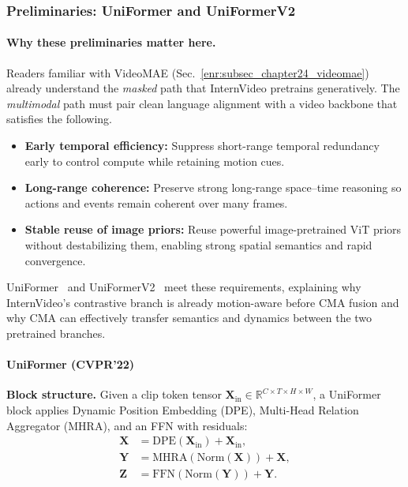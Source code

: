\begin{enrichment}
\begin{enrichment}
        \subsubsection{Preliminaries: UniFormer and UniFormerV2}
        \label{subsubsec_chapter24_uniformer}
        
        \paragraph{Why these preliminaries matter here.}
        Readers familiar with VideoMAE (Sec.~\ref{enr:subsec_chapter24_videomae}) already understand the \emph{masked} path that InternVideo pretrains generatively. The \emph{multimodal} path must pair clean language alignment with a video backbone that satisfies the following.
        
        \begin{itemize}
            \item \textbf{Early temporal efficiency:} Suppress short-range temporal redundancy early to control compute while retaining motion cues. 
            \item \textbf{Long-range coherence:} Preserve strong long-range space--time reasoning so actions and events remain coherent over many frames. 
            \item \textbf{Stable reuse of image priors:} Reuse powerful image-pretrained ViT priors without destabilizing them, enabling strong spatial semantics and rapid convergence. 
        \end{itemize}
        
        UniFormer~\cite{li2022_uniformer} and UniFormerV2~\cite{li2022_uniformerv2} meet these requirements, explaining why InternVideo’s contrastive branch is already motion-aware before CMA fusion and why CMA can effectively transfer semantics and dynamics between the two pretrained branches.
        
        \paragraph{UniFormer (CVPR’22)~\cite{li2022_uniformer}}
        \textbf{Block structure.} Given a clip token tensor \(\bm{X}_{\text{in}}\!\in\!\mathbb{R}^{C\times T\times H\times W}\), a UniFormer block applies Dynamic Position Embedding (DPE), Multi-Head Relation Aggregator (MHRA), and an FFN with residuals:
        \begin{align}
            \bm{X} &= \mathrm{DPE}(\bm{X}_{\text{in}}) + \bm{X}_{\text{in}}, \label{eq:uni_dpe}\\[1mm]
            \bm{Y} &= \mathrm{MHRA}(\mathrm{Norm}(\bm{X})) + \bm{X}, \label{eq:uni_mhra_uniformer}\\[1mm]
            \bm{Z} &= \mathrm{FFN}(\mathrm{Norm}(\bm{Y})) + \bm{Y}. \label{eq:uni_ffn_uniformer}
        \end{align}


\end{enrichment}
\end{enrichment}
